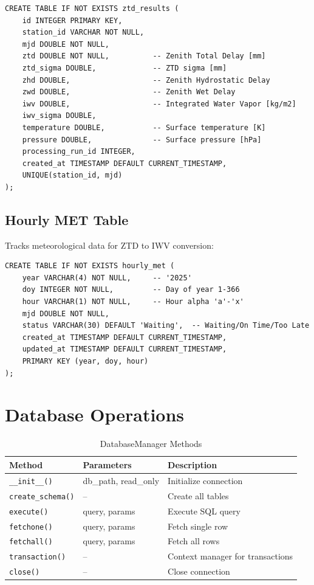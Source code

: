 \documentclass[11pt,a4paper,twoside]{report}
\newcommand{\code}[1]{\texttt{\small\color{primaryblue}#1}}
\begin{document}
\begin{lstlisting}[style=sqlstyle, caption={ZTD Results Table Schema}, label={lst:ztd-schema}]
CREATE TABLE IF NOT EXISTS ztd_results (
    id INTEGER PRIMARY KEY,
    station_id VARCHAR NOT NULL,
    mjd DOUBLE NOT NULL,
    ztd DOUBLE NOT NULL,          -- Zenith Total Delay [mm]
    ztd_sigma DOUBLE,             -- ZTD sigma [mm]
    zhd DOUBLE,                   -- Zenith Hydrostatic Delay
    zwd DOUBLE,                   -- Zenith Wet Delay
    iwv DOUBLE,                   -- Integrated Water Vapor [kg/m2]
    iwv_sigma DOUBLE,
    temperature DOUBLE,           -- Surface temperature [K]
    pressure DOUBLE,              -- Surface pressure [hPa]
    processing_run_id INTEGER,
    created_at TIMESTAMP DEFAULT CURRENT_TIMESTAMP,
    UNIQUE(station_id, mjd)
);
\end{lstlisting}

\subsection{Hourly MET Table}

Tracks meteorological data for ZTD to IWV conversion:

\begin{lstlisting}[style=sqlstyle, caption={Hourly MET Table Schema}, label={lst:met-schema}]
CREATE TABLE IF NOT EXISTS hourly_met (
    year VARCHAR(4) NOT NULL,     -- '2025'
    doy INTEGER NOT NULL,         -- Day of year 1-366
    hour VARCHAR(1) NOT NULL,     -- Hour alpha 'a'-'x'
    mjd DOUBLE NOT NULL,
    status VARCHAR(30) DEFAULT 'Waiting',  -- Waiting/On Time/Too Late
    created_at TIMESTAMP DEFAULT CURRENT_TIMESTAMP,
    updated_at TIMESTAMP DEFAULT CURRENT_TIMESTAMP,
    PRIMARY KEY (year, doy, hour)
);
\end{lstlisting}

\section{Database Operations}

\begin{table}[H]
\centering
\caption{DatabaseManager Methods}
\label{tab:db-methods}
\begin{tabular}{@{}llp{5cm}@{}}
\toprule
\textbf{Method} & \textbf{Parameters} & \textbf{Description} \\
\midrule
\code{\_\_init\_\_()} & db\_path, read\_only & Initialize connection \\
\code{create\_schema()} & -- & Create all tables \\
\code{execute()} & query, params & Execute SQL query \\
\code{fetchone()} & query, params & Fetch single row \\
\code{fetchall()} & query, params & Fetch all rows \\
\code{transaction()} & -- & Context manager for transactions \\
\code{close()} & -- & Close connection \\
\bottomrule
\end{tabular}
\end{table}
\end{document}
